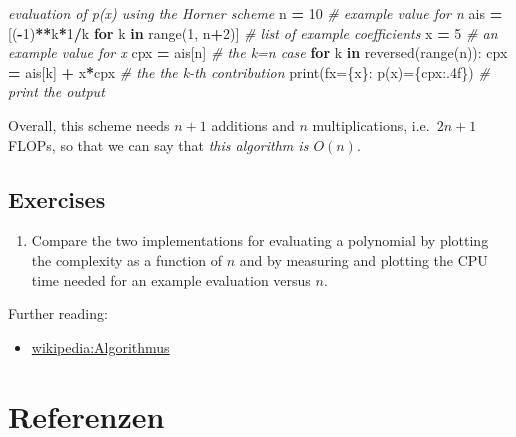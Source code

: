 \documentclass[
]{book}
\newenvironment{Shaded}{\begin{snugshade}}{\end{snugshade}}
\newcommand{\BuiltInTok}[1]{#1}
\newcommand{\CommentTok}[1]{\textcolor[rgb]{0.56,0.35,0.01}{\textit{#1}}}
\newcommand{\ControlFlowTok}[1]{\textcolor[rgb]{0.13,0.29,0.53}{\textbf{#1}}}
\newcommand{\DecValTok}[1]{\textcolor[rgb]{0.00,0.00,0.81}{#1}}
\newcommand{\KeywordTok}[1]{\textcolor[rgb]{0.13,0.29,0.53}{\textbf{#1}}}
\newcommand{\NormalTok}[1]{#1}
\newcommand{\OperatorTok}[1]{\textcolor[rgb]{0.81,0.36,0.00}{\textbf{#1}}}
\newcommand{\SpecialCharTok}[1]{\textcolor[rgb]{0.00,0.00,0.00}{#1}}
\newcommand{\SpecialStringTok}[1]{\textcolor[rgb]{0.31,0.60,0.02}{#1}}
\providecommand{\tightlist}{%
  \setlength{\itemsep}{0pt}\setlength{\parskip}{0pt}}
\theoremstyle{definition}
\theoremstyle{definition}
\theoremstyle{definition}
\theoremstyle{definition}
\theoremstyle{remark}
\begin{document}
\begin{Shaded}
\begin{Highlighting}[]
\CommentTok{\textquotesingle{}\textquotesingle{}\textquotesingle{}evaluation of p(x) using the Horner scheme}
\CommentTok{\textquotesingle{}\textquotesingle{}\textquotesingle{}}
\NormalTok{n }\OperatorTok{=} \DecValTok{10}                                      \CommentTok{\# example value for n}
\NormalTok{ais }\OperatorTok{=}\NormalTok{ [(}\OperatorTok{{-}}\DecValTok{1}\NormalTok{)}\OperatorTok{**}\NormalTok{k}\OperatorTok{*}\DecValTok{1}\OperatorTok{/}\NormalTok{k }\ControlFlowTok{for}\NormalTok{ k }\KeywordTok{in} \BuiltInTok{range}\NormalTok{(}\DecValTok{1}\NormalTok{, n}\OperatorTok{+}\DecValTok{2}\NormalTok{)]  }\CommentTok{\# list of example coefficients}
\NormalTok{x }\OperatorTok{=} \DecValTok{5}                                       \CommentTok{\# an example value for x}
\NormalTok{cpx }\OperatorTok{=}\NormalTok{ ais[n]                                }\CommentTok{\# the k=n case}
\ControlFlowTok{for}\NormalTok{ k }\KeywordTok{in} \BuiltInTok{reversed}\NormalTok{(}\BuiltInTok{range}\NormalTok{(n)):                }
\NormalTok{    cpx }\OperatorTok{=}\NormalTok{ ais[k] }\OperatorTok{+}\NormalTok{ x}\OperatorTok{*}\NormalTok{cpx                    }\CommentTok{\# the the k{-}th contribution}
\BuiltInTok{print}\NormalTok{(}\SpecialStringTok{f\textquotesingle{}x=}\SpecialCharTok{\{x\}}\SpecialStringTok{: p(x)=}\SpecialCharTok{\{}\NormalTok{cpx}\SpecialCharTok{:.4f\}}\SpecialStringTok{\textquotesingle{}}\NormalTok{)             }\CommentTok{\# print the output }
\end{Highlighting}
\end{Shaded}

Overall, this scheme needs \(n+1\) additions and \(n\) multiplications, i.e.~\(2n+1\) FLOPs, so that we can say that \emph{this algorithm is \(O(n)\)}.

\hypertarget{exercises}{%
\section{Exercises}\label{exercises}}

\begin{enumerate}
\def\labelenumi{\arabic{enumi}.}
\tightlist
\item
  Compare the two implementations for evaluating a polynomial by plotting the complexity as a function of \(n\) and by measuring and plotting the CPU time needed for an example evaluation versus \(n\).
\end{enumerate}

Further reading:

\begin{itemize}
\tightlist
\item
  \href{https://de.wikipedia.org/wiki/Algorithmus\#Definition}{wikipedia:Algorithmus}
\end{itemize}

\hypertarget{referenzen}{%
\chapter*{Referenzen}\label{referenzen}}
\end{document}
